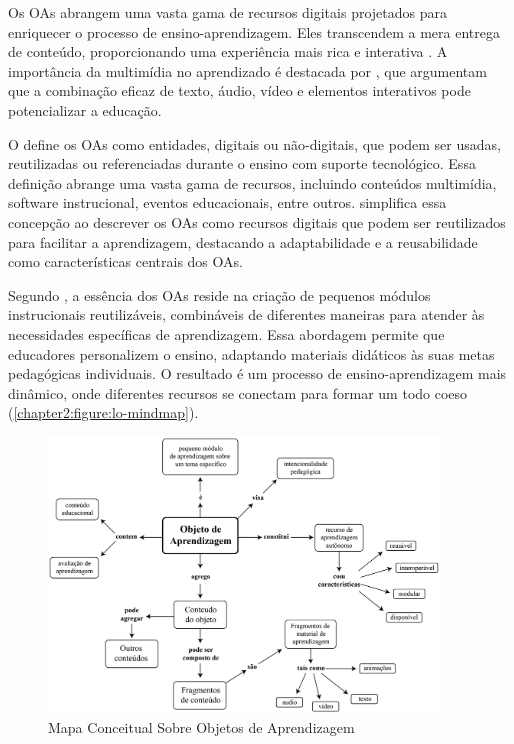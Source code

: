 Os OAs abrangem uma vasta gama de recursos digitais projetados para enriquecer o processo de ensino-aprendizagem. Eles transcendem a mera entrega de conteúdo, proporcionando uma experiência mais rica e interativa \cite{Wiley2000}. A importância da multimídia no aprendizado é destacada por , que argumentam que a combinação eficaz de texto, áudio, vídeo e elementos interativos pode potencializar a educação.


O  define os OAs como entidades, digitais ou não-digitais, que podem ser usadas, reutilizadas ou referenciadas durante o ensino com suporte tecnológico. Essa definição abrange uma vasta gama de recursos, incluindo conteúdos multimídia, software instrucional, eventos educacionais, entre outros.  simplifica essa concepção ao descrever os OAs como recursos digitais que podem ser reutilizados para facilitar a aprendizagem, destacando a adaptabilidade e a reusabilidade como características centrais dos OAs.

Segundo , a essência dos OAs reside na criação de pequenos módulos instrucionais reutilizáveis, combináveis de diferentes maneiras para atender às necessidades específicas de aprendizagem. Essa abordagem permite que educadores personalizem o ensino, adaptando materiais didáticos às suas metas pedagógicas individuais. O resultado é um processo de ensino-aprendizagem mais dinâmico, onde diferentes recursos se conectam para formar um todo coeso (\autoref{chapter2:figure:lo-mindmap}).

\begin{figure}[htb]
\centering
\caption{Mapa Conceitual Sobre Objetos de Aprendizagem}
\label{chapter2:figure:lo-mindmap}
\includegraphics[width=0.925\textwidth]{images/chapter2-lo-mindmap.jpg}
\end{figure}

